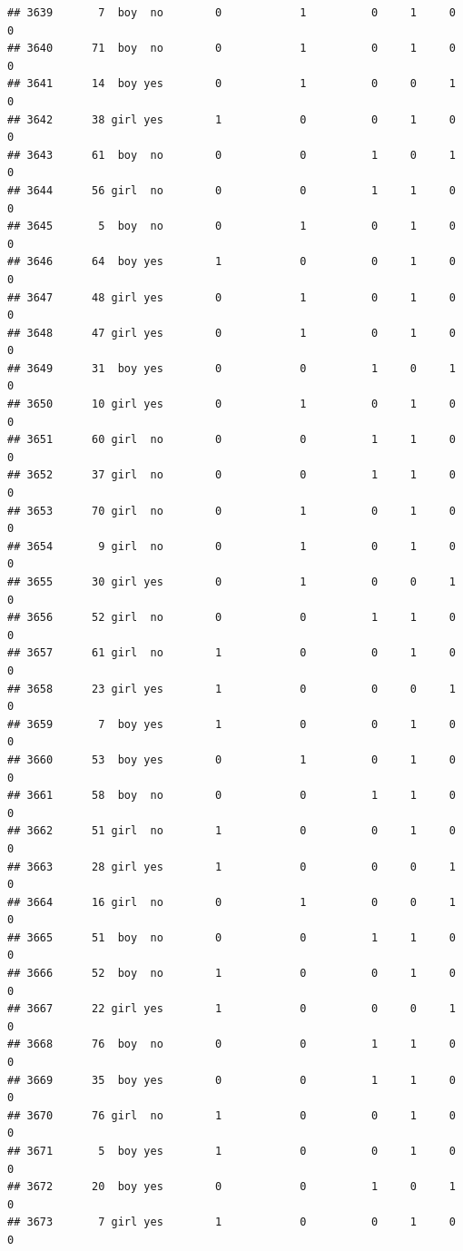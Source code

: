 \documentclass[man]{apa6}
\begin{document}
\begin{verbatim}
## 3639       7  boy  no        0            1          0     1     0     0
## 3640      71  boy  no        0            1          0     1     0     0
## 3641      14  boy yes        0            1          0     0     1     0
## 3642      38 girl yes        1            0          0     1     0     0
## 3643      61  boy  no        0            0          1     0     1     0
## 3644      56 girl  no        0            0          1     1     0     0
## 3645       5  boy  no        0            1          0     1     0     0
## 3646      64  boy yes        1            0          0     1     0     0
## 3647      48 girl yes        0            1          0     1     0     0
## 3648      47 girl yes        0            1          0     1     0     0
## 3649      31  boy yes        0            0          1     0     1     0
## 3650      10 girl yes        0            1          0     1     0     0
## 3651      60 girl  no        0            0          1     1     0     0
## 3652      37 girl  no        0            0          1     1     0     0
## 3653      70 girl  no        0            1          0     1     0     0
## 3654       9 girl  no        0            1          0     1     0     0
## 3655      30 girl yes        0            1          0     0     1     0
## 3656      52 girl  no        0            0          1     1     0     0
## 3657      61 girl  no        1            0          0     1     0     0
## 3658      23 girl yes        1            0          0     0     1     0
## 3659       7  boy yes        1            0          0     1     0     0
## 3660      53  boy yes        0            1          0     1     0     0
## 3661      58  boy  no        0            0          1     1     0     0
## 3662      51 girl  no        1            0          0     1     0     0
## 3663      28 girl yes        1            0          0     0     1     0
## 3664      16 girl  no        0            1          0     0     1     0
## 3665      51  boy  no        0            0          1     1     0     0
## 3666      52  boy  no        1            0          0     1     0     0
## 3667      22 girl yes        1            0          0     0     1     0
## 3668      76  boy  no        0            0          1     1     0     0
## 3669      35  boy yes        0            0          1     1     0     0
## 3670      76 girl  no        1            0          0     1     0     0
## 3671       5  boy yes        1            0          0     1     0     0
## 3672      20  boy yes        0            0          1     0     1     0
## 3673       7 girl yes        1            0          0     1     0     0

\end{verbatim}
\end{document}
